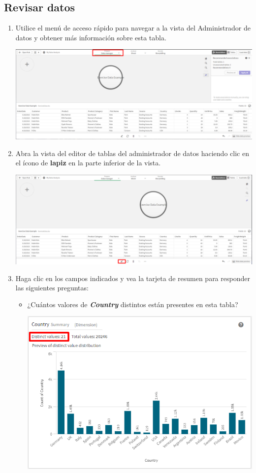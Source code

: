 \documentclass[12pt,letterpaper]{article}
\newcommand\tab[1][1cm]{\hspace*{#1}}
\begin{document}
    \subsection{Revisar datos}
    \begin{enumerate}[\tab 1.]
        \item Utilice el menú de acceso rápido para navegar a la vista del Administrador de datos y obtener más información sobre esta tabla.
        \begin{center}
            \includegraphics[width=13cm]{./img/img4.png}
        \end{center}
        \item Abra la vista del editor de tablas del administrador de datos haciendo clic en el ícono de \textbf{lapiz} en la parte inferior de la vista.
        \begin{center}
            \includegraphics[width=13cm]{./img/img5.png}
        \end{center}
        \item Haga clic en los campos indicados y vea la tarjeta de resumen para responder las siguientes preguntas:
        \begin{itemize}
            \item ¿Cuántos valores de \textit{\textbf{Country}} distintos están presentes en esta tabla?
            \begin{center}
                \includegraphics[width=13cm]{./img/img6.1.png}

\end{center}
\end{itemize}
\end{enumerate}
\end{document}
